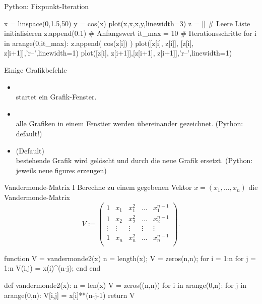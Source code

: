 \documentclass[hyperref={xetex}]{beamer}
\begin{document}
\begin{frame}[fragile]{Python: Fixpunkt-Iteration}
  \begin{pyin}
x = linspace(0,1.5,50)
y = cos(x)
plot(x,x,x,y,linewidth=3)
z = [] # Leere Liste initialisieren
z.append(0.1) # Anfangswert
it_max = 10 # Iterationsschritte 
for i in arange(0,it_max):
    z.append( cos(z[i]) )   
    plot([z[i], z[i]], [z[i], z[i+1]],'r--',linewidth=1)
    plot([z[i], z[i+1]],[z[i+1], z[i+1]],'r--',linewidth=1)    
  \end{pyin}
\end{frame}
%
%
\begin{frame}[fragile]{Einige Grafikbefehle}
\begin{itemize}
\item \alert{ } \\
startet ein Grafik-Fenster.
\item \alert{ }\\
 alle Grafiken in einem Fenstier werden \"ubereinander gezeichnet. (Python: default!)
\item \alert{ } (Default)\\
 bestehende Grafik wird gel\"oscht und durch die neue Grafik ersetzt. (Python: jeweils neue figures erzeugen)
\end{itemize}
\end{frame}
\begin{frame}[fragile]{Vandermonde-Matrix I}
Berechne zu einem gegebenen Vektor
  $x=(x_1, \dots ,x_n)$ die Vandermonde-Matrix
{ \[ V:= \left(\begin{array}{ccccc} 
1 & x_1 & x_1^2 & \hdots & x_1^{n-1}\\
1 & x_2 & x_2^2 & \hdots & x_2^{n-1}\\
\vdots & \vdots & \vdots & \vdots & \vdots\\
1 & x_n & x_n^2 & \hdots & x_n^{n-1}\\
\end{array} \right).  \]}
\end{frame}
%
%
%
\begin{frame}[fragile]{}
  \begin{matlabin}
function V = vandermonde2(x)
  n = length(x);
  V = zeros(n,n);
  for i = 1:n
    for j = 1:n
      V(i,j) = x(i)^(n-j);
    end
  end
  \end{matlabin}
  \begin{pyin}
def vandermonde2(x):
  n = len(x)
  V = zeros((n,n))
  for i in arange(0,n):
    for j in arange(0,n):
      V[i,j] = x[i]**(n-j-1)
  return V
  \end{pyin}
\end{frame}
\end{document}
